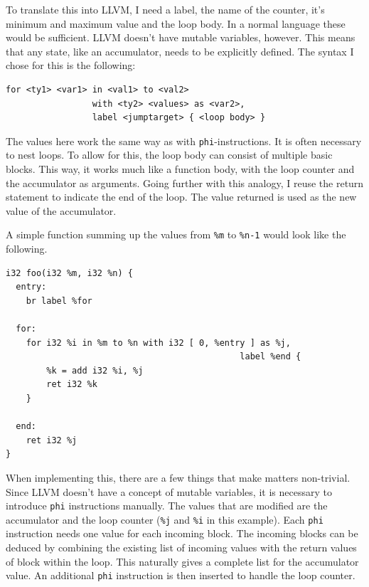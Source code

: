 \documentclass[a4paper,bibliography=totocnumbered,parskip,headsepline]{scrbook}
\begin{document}
To translate this into LLVM, I need a label, the name of the counter, it's minimum and maximum value and the loop body.
In a normal language these would be sufficient.
LLVM doesn't have mutable variables, however.
This means that any state, like an accumulator, needs to be explicitly defined.
The syntax I chose for this is the following:

\begin{lstlisting}[numbers=none]
for <ty1> <var1> in <val1> to <val2>
                 with <ty2> <values> as <var2>,
                 label <jumptarget> { <loop body> }
\end{lstlisting}

The values here work the same way as with \lstinline!phi!-instructions.
It is often necessary to nest loops.
To allow for this, the loop body can consist of multiple basic blocks.
This way, it works much like a function body, with the loop counter and the accumulator as arguments.
Going further with this analogy, I reuse the return statement to indicate the end of the loop.
The value returned is used as the new value of the accumulator.

A simple function summing up the values from \lstinline{%m} to \lstinline{%n-1} would look like the following.
\begin{lstlisting}
i32 foo(i32 %m, i32 %n) {
  entry:
    br label %for

  for:
    for i32 %i in %m to %n with i32 [ 0, %entry ] as %j,
                                              label %end {
        %k = add i32 %i, %j
        ret i32 %k
    }

  end:
    ret i32 %j
}
\end{lstlisting}

When implementing this, there are a few things that make matters non-trivial.
Since LLVM doesn't have a concept of mutable variables, it is necessary to introduce \lstinline{phi} instructions manually.
The values that are modified are the accumulator and the loop counter (\lstinline!%j! and \lstinline!%i! in this example).
Each \lstinline{phi} instruction needs one value for each incoming block.
The incoming blocks can be deduced by combining the existing list of incoming values with the return values of block within the loop.
This naturally gives a complete list for the accumulator value.
An additional \lstinline{phi} instruction is then inserted to handle the loop counter.
\end{document}

